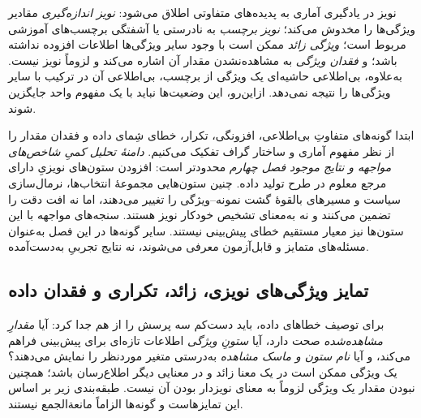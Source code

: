 نویز در یادگیری آماری به پدیده‌های متفاوتی
اطلاق می‌شود: \emph{نویز اندازه‌گیری}
مقادیر ویژگی‌ها را مخدوش می‌کند؛
\emph{نویز برچسب} به نادرستی یا آشفتگی
برچسب‌های آموزشی مربوط است؛
\emph{ویژگی زائد} ممکن است با وجود سایر
ویژگی‌ها اطلاعات افزوده نداشته باشد؛
و \emph{فقدان ویژگی} به مشاهده‌نشدن
مقدار آن اشاره می‌کند و لزوماً نویز نیست.
به‌علاوه، بی‌اطلاعی حاشیه‌ای یک ویژگی
از برچسب، بی‌اطلاعی آن در ترکیب
با سایر ویژگی‌ها را نتیجه نمی‌دهد.
ازاین‌رو، این وضعیت‌ها نباید
با یک مفهوم واحد جایگزین شوند.

ابتدا گونه‌های متفاوتِ بی‌اطلاعی، افزونگی،
تکرار، خطای شِمای داده و فقدان مقدار را
از نظر مفهوم آماری و ساختار گراف
تفکیک می‌کنیم. \emph{دامنهٔ تحلیل کمیِ
شاخص‌های مواجهه و نتایج موجود فصل چهارم}
محدودتر است: افزودن ستون‌های نویزیِ
دارای مرجع معلوم در طرح تولید داده.
چنین ستون‌هایی مجموعهٔ انتخاب‌ها،
نرمال‌سازی سیاست و مسیرهای بالقوهٔ
گشت نمونه--ویژگی را تغییر می‌دهند،
اما نه افت دقت را تضمین می‌کنند و نه
به‌معنای تشخیص خودکار نویز هستند.
سنجه‌های مواجهه با این ستون‌ها
نیز معیار مستقیم خطای پیش‌بینی نیستند.
سایر گونه‌ها در این فصل به‌عنوان
مسئله‌های متمایز و قابل‌آزمون معرفی
می‌شوند، نه نتایج تجربیِ به‌دست‌آمده.



\subsection{تمایز ویژگی‌های نویزی، زائد، تکراری و فقدان داده}
\label{cmp:subsec:ch3-feature-error-types}
برای توصیف خطاهای داده، باید دست‌کم سه پرسش را
از هم جدا کرد: آیا \emph{مقدارِ مشاهده‌شده}
صحت دارد، آیا \emph{ستونِ ویژگی} اطلاعات تازه‌ای
برای پیش‌بینی فراهم می‌کند، و آیا
\emph{نام ستون و ماسک مشاهده} به‌درستی
متغیر موردنظر را نمایش می‌دهند؟
یک ویژگی ممکن است در یک معنا زائد و در
معنایی دیگر اطلاع‌رسان باشد؛ همچنین
نبودن مقدار یک ویژگی لزوماً به معنای
نویزدار بودن آن نیست. طبقه‌بندی زیر
بر اساس این تمایزهاست و گونه‌ها
الزاماً مانعةالجمع نیستند.

